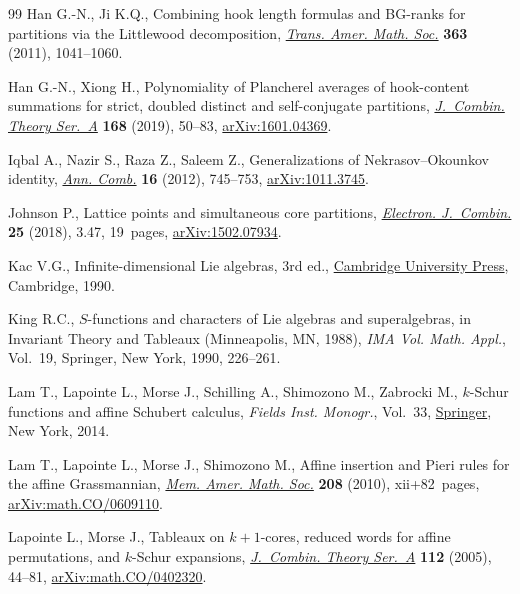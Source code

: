\documentclass[pdftex]{sigma}
\numberwithin{equation}{section}
\begin{document}
\begin{thebibliography}{99}
Han G.-N., Ji K.Q., Combining hook length formulas and {BG}-ranks for partitions
 via the {L}ittlewood decomposition, \href{https://doi.org/10.1090/S0002-9947-2010-05191-8}{\textit{Trans. Amer. Math. Soc.}}
 \textbf{363} (2011), 1041--1060.

Han G.-N., Xiong H., Polynomiality of {P}lancherel averages of hook-content
 summations for strict, doubled distinct and self-conjugate partitions,
 \href{https://doi.org/10.1016/j.jcta.2019.05.012}{\textit{J.~Combin. Theory Ser.~A}} \textbf{168} (2019), 50--83,
 \href{https://arxiv.org/abs/1601.04369}{arXiv:1601.04369}.

Iqbal A., Nazir S., Raza Z., Saleem Z., Generalizations of
 {N}ekrasov--{O}kounkov identity, \href{https://doi.org/10.1007/s00026-012-0157-2}{\textit{Ann. Comb.}} \textbf{16} (2012),
 745--753, \href{https://arxiv.org/abs/1011.3745}{arXiv:1011.3745}.

Johnson P., Lattice points and simultaneous core partitions, \href{https://doi.org/10.37236/5734}{\textit{Electron.
 J.~Combin.}} \textbf{25} (2018), 3.47, 19~pages, \href{https://arxiv.org/abs/1502.07934}{arXiv:1502.07934}.

Kac V.G., Infinite-dimensional {L}ie algebras, 3rd ed., \href{https://doi.org/10.1017/CBO9780511626234}{Cambridge University
 Press}, Cambridge, 1990.

King R.C., {$S$}-functions and characters of {L}ie algebras and superalgebras,
 in Invariant Theory and Tableaux ({M}inneapolis, {MN}, 1988), \textit{IMA
 Vol. Math. Appl.}, Vol.~19, Springer, New York, 1990, 226--261.

Lam T., Lapointe L., Morse J., Schilling A., Shimozono M., Zabrocki M.,
 {$k$}-{S}chur functions and affine {S}chubert calculus, \textit{Fields Inst.
 Monogr.}, Vol.~33, \href{https://doi.org/10.1007/978-1-4939-0682-6}{Springer}, New York, 2014.

Lam T., Lapointe L., Morse J., Shimozono M., Affine insertion and {P}ieri rules
 for the affine {G}rassmannian, \href{https://doi.org/10.1090/S0065-9266-10-00576-4}{\textit{Mem. Amer. Math. Soc.}} \textbf{208}
 (2010), xii+82~pages, \href{https://arxiv.org/abs/math.CO/0609110}{arXiv:math.CO/0609110}.

Lapointe L., Morse J., Tableaux on {$k+1$}-cores, reduced words for affine
 permutations, and {$k$}-{S}chur expansions, \href{https://doi.org/10.1016/j.jcta.2005.01.003}{\textit{J.~Combin. Theory Ser.~A}}
 \textbf{112} (2005), 44--81, \href{https://arxiv.org/abs/math.CO/0402320}{arXiv:math.CO/0402320}.


\end{thebibliography}
\end{document}
